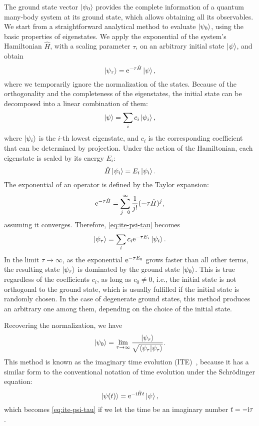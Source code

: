 The ground state vector $\ket{\psi_0}$ provides the complete information of a quantum many-body system at its ground state, which allows obtaining all its observables. We start from a straightforward analytical method to evaluate $\ket{\psi_0}$, using the basic properties of eigenstates. We apply the exponential of the system's Hamiltonian $\hat{H}$, with a scaling parameter $\tau$, on an arbitrary initial state $\ket{\psi}$, and obtain
\begin{equation}
\ket{\psi_\tau} = \mathrm{e}^{-\tau \hat{H}} \ket{\psi},
\label{eq:ite-psi-tau}
\end{equation}
where we temporarily ignore the normalization of the states. Because of the orthogonality and the completeness of the eigenstates, the initial state can be decomposed into a linear combination of them:
\begin{equation}
\ket{\psi} = \sum_i c_i \ket{\psi_i},
\end{equation}
where $\ket{\psi_i}$ is the $i$-th lowest eigenstate, and $c_i$ is the corresponding coefficient that can be determined by projection. Under the action of the Hamiltonian, each eigenstate is scaled by its energy $E_i$:
\begin{equation}
\hat{H} \ket{\psi_i} = E_i \ket{\psi_i}.
\end{equation}
The exponential of an operator is defined by the Taylor expansion:
\begin{equation}
\mathrm{e}^{-\tau \hat{H}} = \sum_{j = 0}^\infty \frac{1}{j!} (-\tau \hat{H})^j,
\label{eq:ite-taylor}
\end{equation}
assuming it converges. Therefore, \cref{eq:ite-psi-tau} becomes
\begin{equation}
\ket{\psi_\tau} = \sum_i c_i \mathrm{e}^{-\tau E_i} \ket{\psi_i}.
\end{equation}
In the limit $\tau \to \infty$, as the exponential $\mathrm{e}^{-\tau E_0}$ grows faster than all other terms, the resulting state $\ket{\psi_\tau}$ is dominated by the ground state $\ket{\psi_0}$. This is true regardless of the coefficients $c_i$, as long as $c_0 \neq 0$, i.e., the initial state is not orthogonal to the ground state, which is usually fulfilled if the initial state is randomly chosen. In the case of degenerate ground states, this method produces an arbitrary one among them, depending on the choice of the initial state.

Recovering the normalization, we have
\begin{equation}
\ket{\psi_0} = \lim_{\tau \to \infty} \frac{\ket{\psi_\tau}}{\sqrt{\ip{\psi_\tau}}}.
\label{eq:ite}
\end{equation}
This method is known as the imaginary time evolution (ITE)~\cite{goldberg1967integration}, because it has a similar form to the conventional notation of time evolution under the Schrödinger equation:
\begin{equation}
\ket{\psi(t)} = \mathrm{e}^{-\mathrm{i} \hat{H} t} \ket{\psi},
\end{equation}
which becomes \cref{eq:ite-psi-tau} if we let the time be an imaginary number $t = -\mathrm{i} \tau$.

